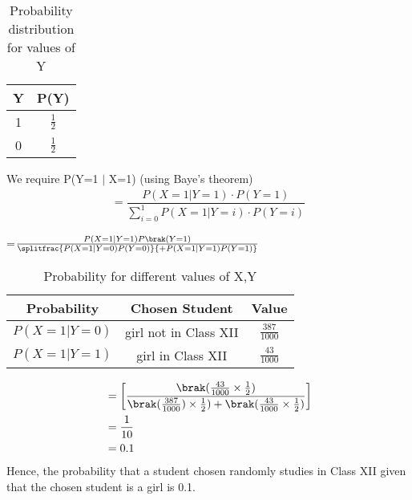 \documentclass[journal,12pt,two column]{IEEEtran}
\begin{document}
\begin{table}[ht]
\caption{Probability distribution for values of Y}
\label{table:1}
\begin{center}
    \begin{tabular}{|c|c|}
    \hline
    Y & P(Y)\\
    \hline
    1 & $\frac{1}{2}$ \\
    \hline
    0 & $\frac{1}{2}$\\
    \hline
    \end{tabular}
\end{center} 
\end{table}
We require P(Y=1 $\vert$ X=1) (using Baye's theorem)
\begin{align}
=\dfrac{P(X=1\vert Y=1)\cdot P(Y=1)}{\sum_{i=0}^{1} P(X=1\vert Y=i)\cdot P(Y=i)}
\end{align}
\begin{center} 
=$\frac{P(X=1 \vert Y=1)P\brak(Y=1)}{\splitfrac{P(X=1\vert Y=0)P(Y=0)}{+P(X=1\vert Y=1)P(Y=1)}}$
\end{center}
\begin{table}[ht]
\caption{Probability for different values of X,Y}
\label{table:2}
\begin{center}
    \begin{tabular}{|c|c|c|}
    \hline
    Probability & Chosen Student & Value\\
    \hline
    $P(X=1\vert Y=0)$ & girl not in Class XII & $\frac{387}{1000}$\\
    \hline
    $ P(X=1\vert Y=1)$ & girl in Class XII & $\frac{43}{1000}$ \\
    \hline
    \end{tabular}
\end{center}    
\end{table} 
\begin{align}
&=\left[\dfrac{\brak( \frac{43}{1000}\times \frac{1}{2})}{\brak( \frac{387}{1000})\times \frac{1}{2}) + \brak( \frac{43}{1000}\times \frac{1}{2})}\right]\\
&=\dfrac{1}{10}\\ 
&=0.1
\end{align}
Hence, the probability that a student chosen randomly studies in Class XII given that the chosen student is a girl is 0.1.
\end{document}
